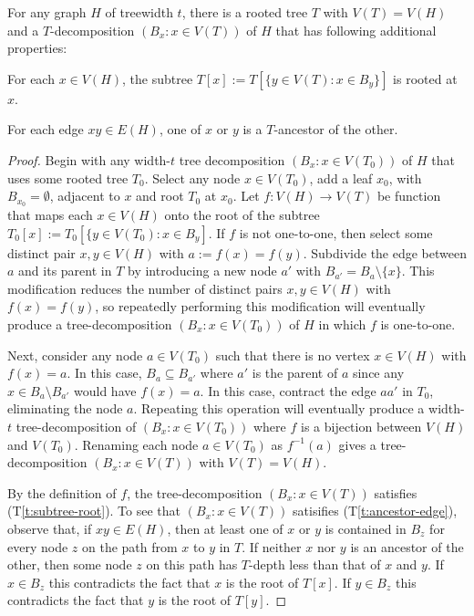 \documentclass{patmorin}
\newcommand{\tlabel}[1]{\label{t:#1}}
\newcommand{\tref}[1]{(T\ref{t:#1})}
\renewcommand{\le}{\leqslant}
\begin{document}
\begin{lem}
  For any graph $H$ of treewidth $t$, there is a rooted tree $T$ with $V(T)=V(H)$ and a $T$-decomposition $(B_x:x\in V(T))$ of $H$ that has following additional properties:  
  \begin{compactenum}[(T1)]
    \item\tlabel{subtree-root} For each $x\in V(H)$, the subtree $T[x]:=T[\{y\in V(T):x\in B_y\}]$ is rooted at $x$.
    \item\tlabel{ancestor-edge}\tlabel{last} For each edge $xy\in E(H)$, one of $x$ or $y$ is a $T$-ancestor of the other.
  \end{compactenum}
\end{lem}

\begin{proof}
  Begin with any width-$t$ tree decomposition $(B_x:x\in V(T_0))$ of $H$ that uses some rooted tree $T_0$.  Select any node $x\in V(T_0)$, add a leaf $x_0$, with $B_{x_0}=\emptyset$, adjacent to $x$ and root $T_0$ at $x_0$.  Let $f:V(H)\to V(T)$ be function that maps each $x\in V(H)$ onto the root of the subtree $T_0[x]:=T_0[\{y\in V(T_0): x\in B_y]$.  If $f$ is not one-to-one, then select some distinct pair $x,y\in V(H)$ with $a:=f(x)=f(y)$.  Subdivide the edge between $a$ and its parent in $T$ by introducing a new node $a'$ with $B_{a'}=B_{a}\setminus\{x\}$.  This modification reduces the number of distinct pairs $x,y\in V(H)$ with $f(x)=f(y)$, so repeatedly performing this modification will eventually produce a tree-decomposition $(B_x:x\in V(T_0))$ of $H$ in which $f$ is one-to-one.
  
  Next, consider any node $a\in V(T_0)$ such that there is no vertex $x\in V(H)$ with $f(x)=a$.  In this case, $B_{a}\subseteq B_{a'}$ where $a'$ is the parent of $a$ since any $x\in B_a\setminus B_{a'}$ would have $f(x)=a$.  In this case, contract the edge $aa'$ in $T_0$, eliminating the node $a$.  Repeating this operation will eventually produce a width-$t$ tree-decomposition of $(B_x:x\in V(T_0))$ where $f$ is a bijection between $V(H)$ and $V(T_0)$.  Renaming each node $a\in V(T_0)$ as $f^{-1}(a)$ gives a tree-decomposition $(B_x:x\in V(T))$ with $V(T)=V(H)$.  
  
  By the definition of $f$, the tree-decomposition $(B_x:x\in V(T))$ satisfies \tref{subtree-root}.  To see that $(B_x:x\in V(T))$ satisifies \tref{ancestor-edge}, observe that, if $xy\in E(H)$, then at least one of $x$ or $y$ is contained in $B_z$ for every node $z$ on the path from $x$ to $y$ in $T$.  If neither $x$ nor $y$ is an ancestor of the other, then some node $z$ on this path has $T$-depth less than that of $x$ and $y$.  If $x\in B_z$ this contradicts the fact that $x$ is the root of $T[x]$.  If $y\in B_z$ this contradicts the fact that $y$ is the root of $T[y]$.
\end{proof}
\end{document}
